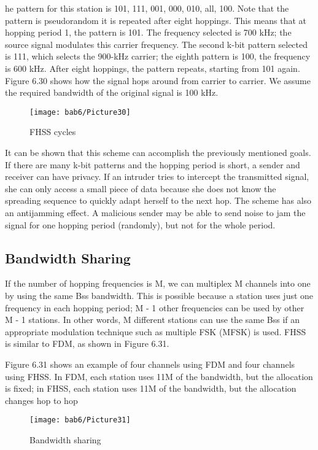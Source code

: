 he pattern for this station is 101, 111, 001, 000, 010, all, 100. Note that the pattern is pseudorandom it is repeated after eight hoppings. This means that at hopping period 1, the pattern is 101. The frequency selected is 700 kHz; the source signal modulates this carrier frequency. The second k-bit pattern selected is 111, which selects the 900-kHz carrier; the eighth pattern is 100, the frequency is 600 kHz. After eight hoppings, the pattern repeats, starting from 101 again. Figure 6.30 shows how the signal hops around from carrier to carrier. We assume the required bandwidth of the original signal is 100 kHz.

\begin{figure}[htbp]
  \centering
  \texttt{[image: bab6/Picture30]}
  \caption{FHSS cycles}
  \label{fig6:29}
\end{figure}

It can be shown that this scheme can accomplish the previously mentioned goals. If there are many k-bit patterns and the hopping period is short, a sender and receiver can have privacy. If an intruder tries to intercept the transmitted signal, she can only access a small piece of data because she does not know the spreading sequence to quickly adapt herself to the next hop. The scheme has also an antijamming effect. A malicious sender may be able to send noise to jam the signal for one hopping period (randomly), but not for the whole period.

\subsection*{Bandwidth Sharing}
If the number of hopping frequencies is M, we can multiplex M channels into one by using the same Bss bandwidth. This is possible because a station uses just one frequency in each hopping period; M - 1 other frequencies can be used by other M - 1 stations. In other words, M different stations can use the same Bss if an appropriate modulation technique such as multiple FSK (MFSK) is used. FHSS is similar to FDM, as shown in Figure 6.31.

Figure 6.31 shows an example of four channels using FDM and four channels using FHSS. In FDM, each station uses 11M of the bandwidth, but the allocation is fixed; in FHSS, each station uses 11M of the bandwidth, but the allocation changes hop to hop

\begin{figure}[htbp]
  \centering
  \texttt{[image: bab6/Picture31]}
  \caption{Bandwidth sharing}
  \label{fig6:30}
\end{figure}

